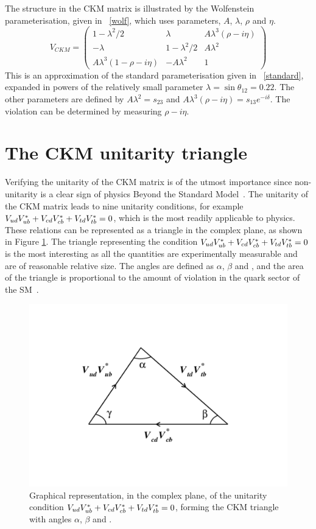 The structure in the CKM matrix is illustrated by the Wolfenstein parameterisation, given in \eqn~\ref{wolf}, which uses parameters, $A$, $\lambda$, $\rho$ and $\eta$. 
\begin{equation}
V_{CKM} = \begin{pmatrix} 1 - \lambda^2/2 & \lambda & A\lambda^3(\rho - i\eta) \\ 
-\lambda & 1 - \lambda^2/2 & A\lambda^2 \\ 
A\lambda^3(1 - \rho - i\eta) & -A\lambda^2 & 1 \end{pmatrix}
\label{wolf}
\end{equation} 
This is an approximation of the standard parameterisation given in \eqn~\ref{standard}, expanded in powers of the relatively small parameter $\lambda = \sin\theta_{12} = 0.22$. The other parameters are defined by $A\lambda^2 = s_{23}$ and $A\lambda^3(\rho - i\eta) = s_{13}e^{-i\delta}$. The \CP violation can be determined by measuring $\rho - i\eta$.

\section{The CKM unitarity triangle}

Verifying the unitarity of the CKM matrix is of the utmost importance since non-unitarity is a clear sign of physics Beyond the Standard Model~\cite{CKMtriangle}. The unitarity of the CKM matrix leads to nine unitarity conditions, for example ${V_{{u}{d}}}{V_{{u}{b}}^\ast} + {V_{{c}{d}}}{V_{{c}{b}}^\ast} + {V_{{t}{d}}}{V_{{t}{b}}^\ast} = 0$, which is the most readily applicable to \B physics. These relations can be represented as a triangle in the complex plane, as shown in Figure \ref{triangle}. The triangle representing the condition ${V_{{u}{d}}}{V_{{u}{b}}^\ast} + {V_{{c}{d}}}{V_{{c}{b}}^\ast} + {V_{{t}{d}}}{V_{{t}{b}}^\ast} = 0$ is the most interesting as all the quantities are experimentally measurable and are of reasonable relative size. The angles are defined as $\alpha$, $\beta$ and \Pgamma, and the area of the triangle is proportional to the amount of \CP violation in the quark sector of the SM~\cite{CKMtriangle}. 
\begin{figure}
\centering
\includegraphics[trim = 50mm 50mm 50mm 50mm,clip,width=0.6\linewidth]{figures/theory/triangle.pdf}
\caption{Graphical representation, in the complex plane, of the unitarity condition ${V_{{u}{d}}}{V_{{u}{b}}^\ast} + {V_{{c}{d}}}{V_{{c}{b}}^\ast} + {V_{{t}{d}}}{V_{{t}{b}}^\ast} = 0$, forming the CKM triangle with angles $\alpha$, $\beta$ and \Pgamma.}
\label{triangle}
\end{figure}

